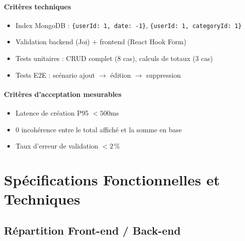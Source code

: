 \paragraph{Critères techniques}
\begin{itemize}
  \item Index MongoDB : \texttt{\{userId: 1, date: -1\}}, \texttt{\{userId: 1, categoryId: 1\}}
  \item Validation backend (Joi) + frontend (React Hook Form)
  \item Tests unitaires : CRUD complet (8 cas), calculs de totaux (3 cas)
  \item Tests E2E : scénario ajout $\rightarrow$ édition $\rightarrow$ suppression
\end{itemize}

\paragraph{Critères d'acceptation mesurables}
\begin{itemize}
  \item[$\checkmark$] Latence de création P95 $< 500$ms
  \item[$\checkmark$] 0 incohérence entre le total affiché et la somme en base
  \item[$\checkmark$] Taux d'erreur de validation $< 2\,\%$
\end{itemize}

\section{Spécifications Fonctionnelles et Techniques}

\subsection{Répartition Front-end / Back-end}


